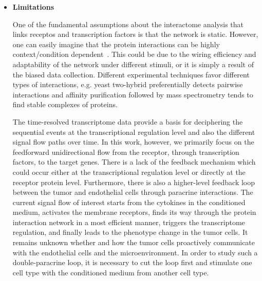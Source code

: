 \begin{itemize}

\item \textbf{Limitations}

One of the fundamental assumptions about the interactome analysis that links receptos
and transcription factors is that the network is static. However, one can 
easily imagine that the protein interactions can be highly context/condition
dependent~\citep{Przytycka2010b,Schaefer2013}. This could be due to the wiring efficiency
and adaptability of the network under different stimuli, or it is simply 
a result of the biased data collection. Different experimental
techniques favor different types of interactions, e.g. yeast two-hybrid 
preferentially detects pairwise interactions and affinity purification
followed by mass spectrometry tends to find stable complexes of proteins.

The time-resolved transcriptome data provide a basis for deciphering the
sequential events at the transcriptional regulation level and also the 
different signal flow paths over time. In this work, however, we primarily
focus on the feedforward unidirectional flow from the receptor, through
transcription factors, to the target genes. There is a lack of the 
feedback mechanism which could occur either at the transcriptional
regulation level or directly at the receptor protein level. 
Furthermore, there is also a higher-level feedback loop
between the tumor and endothelial cells through paracrine 
interactions. The current signal flow of interest starts 
from the
cytokines in the conditioned medium, activates the membrane
receptors, finds its way through the protein interaction
network in a most efficient manner, triggers the 
transcriptome regulation, and finally leads to the phenotype
change in the tumor cells. It remains unknown whether and how
the tumor cells proactively communicate with the 
endothelial cells and the microenvironment. In order to
study such a double-paracrine loop, it is necessary to cut
the loop first and stimulate one cell type with the 
conditioned medium from another cell type.


\end{itemize}
